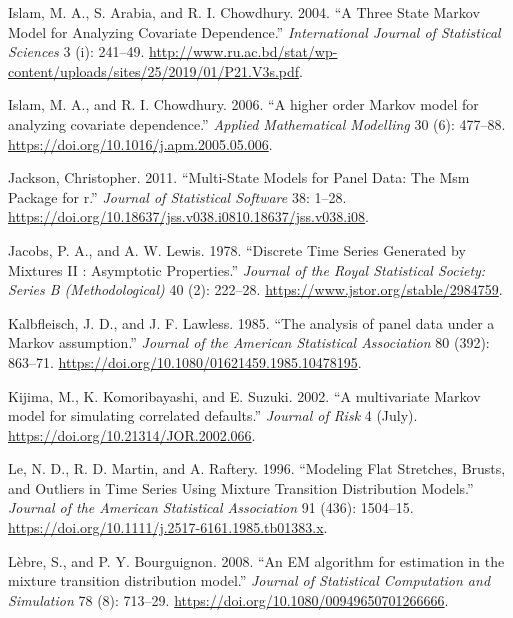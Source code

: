 \begin{CSLReferences}{1}{0}
\leavevmode{}%
Islam, M. A., S. Arabia, and R. I. Chowdhury. 2004. {``{A Three State Markov Model for Analyzing Covariate Dependence}.''} \emph{International Journal of Statistical Sciences} 3 (i): 241--49. \url{http://www.ru.ac.bd/stat/wp-content/uploads/sites/25/2019/01/P21.V3s.pdf}.

\leavevmode{}%
Islam, M. A., and R. I. Chowdhury. 2006. {``{A higher order Markov model for analyzing covariate dependence}.''} \emph{Applied Mathematical Modelling} 30 (6): 477--88. \url{https://doi.org/10.1016/j.apm.2005.05.006}.

\leavevmode{}%
Jackson, Christopher. 2011. {``Multi-State Models for Panel Data: The Msm Package for r.''} \emph{Journal of Statistical Software} 38: 1--28. \url{https://doi.org/10.18637/jss.v038.i0810.18637/jss.v038.i08}.

\leavevmode{}%
Jacobs, P. A., and A. W. Lewis. 1978. {``{Discrete Time Series Generated by Mixtures II : Asymptotic Properties}.''} \emph{Journal of the Royal Statistical Society: Series B (Methodological)} 40 (2): 222--28. \url{https://www.jstor.org/stable/2984759}.

\leavevmode{}%
Kalbfleisch, J. D., and J. F. Lawless. 1985. {``{The analysis of panel data under a Markov assumption}.''} \emph{Journal of the American Statistical Association} 80 (392): 863--71. \url{https://doi.org/10.1080/01621459.1985.10478195}.

\leavevmode{}%
Kijima, M., K. Komoribayashi, and E. Suzuki. 2002. {``{A multivariate Markov model for simulating correlated defaults}.''} \emph{Journal of Risk} 4 (July). \url{https://doi.org/10.21314/JOR.2002.066}.

\leavevmode{}%
Le, N. D., R. D. Martin, and A. Raftery. 1996. {``{Modeling Flat Stretches, Brusts, and Outliers in Time Series Using Mixture Transition Distribution Models}.''} \emph{Journal of the American Statistical Association} 91 (436): 1504--15. \url{https://doi.org/10.1111/j.2517-6161.1985.tb01383.x}.

\leavevmode{}%
Lèbre, S., and P. Y. Bourguignon. 2008. {``{An EM algorithm for estimation in the mixture transition distribution model}.''} \emph{Journal of Statistical Computation and Simulation} 78 (8): 713--29. \url{https://doi.org/10.1080/00949650701266666}.


\end{CSLReferences}
